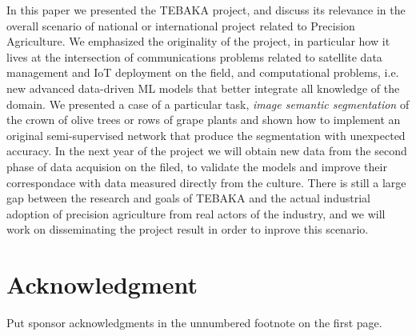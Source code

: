 \documentclass[comsoc,final]{IEEEtran}
\begin{document}
In this paper we presented the TEBAKA project, and discuss its relevance in the overall scenario of national or international project related to Precision Agriculture. We emphasized the originality of the project, in particular how it lives at the intersection of communications problems related to satellite data management and IoT deployment on the field, and computational problems, i.e. new advanced data-driven ML models that better integrate all knowledge of the domain.
We presented a case of a particular task, \emph{image semantic segmentation} of the crown of olive trees or rows of grape plants and shown how to implement an original semi-supervised network that produce the segmentation with unexpected accuracy. In the next year of the project we will obtain new data from the second phase of data acquision on the filed, to validate the models and improve their correspondace with data measured directly from the culture. There is still a large gap between the research and goals of TEBAKA and the actual industrial adoption of precision agriculture from real actors of the industry, and we will work on disseminating the project result in order to inprove this scenario.


\section*{Acknowledgment} Put sponsor 
acknowledgments in the unnumbered footnote on the first page.

\printbibliography
\end{document}
